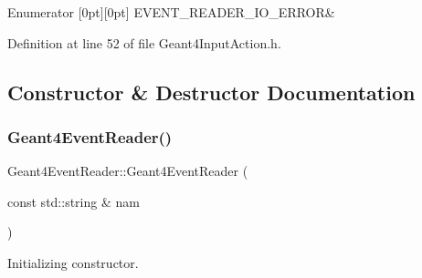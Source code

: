 \begin{DoxyEnumFields}{Enumerator}
[0pt][0pt]{}\hypertarget{class_d_d4hep_1_1_simulation_1_1_geant4_event_reader_ae4f4bc83ffcf5b0c1868ad78859851e7a228cd68e3e7f8d4562f18996cae80e46}{}\label{class_d_d4hep_1_1_simulation_1_1_geant4_event_reader_ae4f4bc83ffcf5b0c1868ad78859851e7a228cd68e3e7f8d4562f18996cae80e46} 
E\+V\+E\+N\+T\+\_\+\+R\+E\+A\+D\+E\+R\+\_\+\+I\+O\+\_\+\+E\+R\+R\+OR&\\
\hline

\end{DoxyEnumFields}


Definition at line 52 of file Geant4\+Input\+Action.\+h.



\subsection{Constructor \& Destructor Documentation}
\hypertarget{class_d_d4hep_1_1_simulation_1_1_geant4_event_reader_abf6dc1e6d792edd26889a527310054f0}{}\label{class_d_d4hep_1_1_simulation_1_1_geant4_event_reader_abf6dc1e6d792edd26889a527310054f0} 
\subsubsection{\texorpdfstring{Geant4\+Event\+Reader()}{Geant4EventReader()}}
{\footnotesize\ttfamily Geant4\+Event\+Reader\+::\+Geant4\+Event\+Reader (\begin{DoxyParamCaption}\item[{const std\+::string \&}]{nam }\end{DoxyParamCaption})}



Initializing constructor. 



